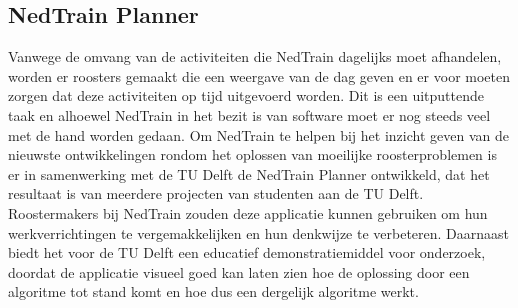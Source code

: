 \subsection{NedTrain Planner}
Vanwege de omvang van de activiteiten die NedTrain dagelijks moet afhandelen, worden er roosters gemaakt die een weergave van de dag geven en er voor moeten zorgen dat deze activiteiten op tijd uitgevoerd worden. Dit is een uitputtende taak en alhoewel NedTrain in het bezit is van software moet er nog steeds veel met de hand worden gedaan. Om NedTrain te helpen bij het inzicht geven van de nieuwste ontwikkelingen rondom het oplossen van moeilijke roosterproblemen is er in samenwerking met de TU Delft de NedTrain Planner ontwikkeld, dat het resultaat is van meerdere projecten van studenten aan de TU Delft. Roostermakers bij NedTrain zouden deze applicatie kunnen gebruiken om hun werkverrichtingen te vergemakkelijken en hun denkwijze te verbeteren. Daarnaast biedt het voor de TU Delft een educatief demonstratiemiddel voor onderzoek, doordat de applicatie visueel goed kan laten zien hoe de oplossing door een algoritme tot stand komt en hoe dus een dergelijk algoritme werkt.